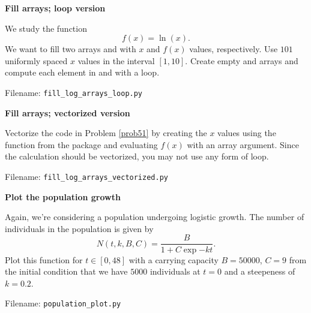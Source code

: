 
\begin{Problem}{\textbf{Fill arrays; loop version}} \label{prob51}

\noindent We study the function
\begin{equation*}
f(x) = \ln(x).
\end{equation*}
We want to fill two arrays  and  with $x$ and $f(x)$ values,
respectively. Use $101$ uniformly spaced $x$ values in the interval $[1, 10]$.
Create empty  and  arrays and compute each element in
 and  with a  loop. 

Filename: \texttt{fill\_log\_arrays\_loop.py}
\end{Problem}

\begin{Problem}{\textbf{Fill arrays; vectorized version}}

\noindent Vectorize the code in Problem \ref{prob51} by creating the $x$ values using the
 function from the  package and evaluating
$f(x)$ with an array argument. Since the calculation should be vectorized, you may not use any form of loop.

Filename: \texttt{fill\_log\_arrays\_vectorized.py}
\end{Problem}



\begin{Problem}{\textbf{Plot the population growth}}

\noindent Again, we're considering a population undergoing logistic growth. The number of
individuals in the population is given by
\begin{equation*}
N(t, k, B, C) = \frac{B}{1 + C \exp{-kt}}.
\end{equation*}
Plot this function for $t \in [0, 48]$ with a carrying capacity $B = 50 000$,
$C = 9$ from the initial condition that we have $5 000$ individuals at $t = 0$
and a steepeness of $k = 0.2$.

Filename: \texttt{population\_plot.py}
\end{Problem}

